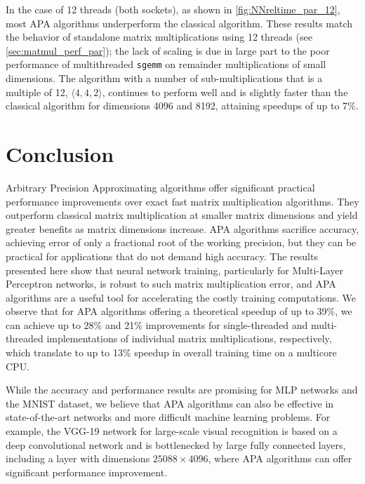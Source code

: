 \documentclass[conference]{IEEEtran}
\newcommand{\dims}[1]{\langle #1 \rangle}
\begin{document}
In the case of 12 threads (both sockets), as shown in \cref{fig:NNreltime_par_12}, most APA algorithms underperform the classical algorithm.
These results match the behavior of standalone matrix multiplications using 12 threads (see \cref{sec:matmul_perf_par}); the lack of scaling is due in large part to the poor performance of multithreaded \texttt{sgemm} on remainder multiplications of small dimensions.
The algorithm with a number of sub-multiplications that is a multiple of 12, $\dims{4,4,2}$, continues to perform well and is slightly faster than the classical algorithm for dimensions 4096 and 8192, attaining speedups of up to 7\%.

\section{Conclusion}

Arbitrary Precision Approximating algorithms offer significant practical performance improvements over exact fast matrix multiplication algorithms.
They outperform classical matrix multiplication at smaller matrix dimensions and yield greater benefits as matrix dimensions increase.
APA algorithms sacrifice accuracy, achieving error of only a fractional root of the working precision, but they can be practical for applications that do not demand high accuracy.
The results presented here show that neural network training, particularly for Multi-Layer Perceptron networks, is robust to such matrix multiplication error, and APA algorithms are a useful tool for accelerating the costly training computations.
We observe that for APA algorithms offering a theoretical speedup of up to 39\%, we can achieve up to 28\% and 21\% improvements for single-threaded and multi-threaded implementations of individual matrix multiplications, respectively, which translate to up to 13\% speedup in overall training time on a multicore CPU.

While the accuracy and performance results are promising for MLP networks and the MNIST dataset, we believe that APA algorithms can also be effective in state-of-the-art networks and more difficult machine learning problems.
For example, the VGG-19 network for large-scale visual recognition \cite{SZ15} is based on a deep convolutional network and is bottlenecked by large fully connected layers, including a layer with dimensions $25088\times 4096$, where APA algorithms can offer significant performance improvement.
\end{document}
